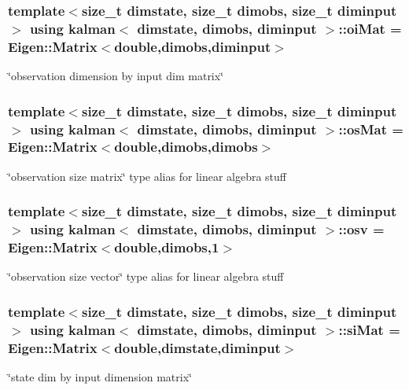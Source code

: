 \subsubsection[{\texorpdfstring{oi\+Mat}{oiMat}}]{\setlength{\rightskip}{0pt plus 5cm}template$<$size\+\_\+t dimstate, size\+\_\+t dimobs, size\+\_\+t diminput$>$ using {\bf kalman}$<$ dimstate, dimobs, diminput $>$\+::{\bf oi\+Mat} =  Eigen\+::\+Matrix$<$double,dimobs,diminput$>$\hspace{0.3cm}{\ttfamily [private]}}\hypertarget{classkalman_a2a9c411927e8ae35144b2c40dac2f3d1}{}\label{classkalman_a2a9c411927e8ae35144b2c40dac2f3d1}
\char`\"{}observation dimension by input dim matrix\char`\"{} 
\subsubsection[{\texorpdfstring{os\+Mat}{osMat}}]{\setlength{\rightskip}{0pt plus 5cm}template$<$size\+\_\+t dimstate, size\+\_\+t dimobs, size\+\_\+t diminput$>$ using {\bf kalman}$<$ dimstate, dimobs, diminput $>$\+::{\bf os\+Mat} =  Eigen\+::\+Matrix$<$double,dimobs,dimobs$>$\hspace{0.3cm}{\ttfamily [private]}}\hypertarget{classkalman_a092ff444bcb70f49972e645bc993fd79}{}\label{classkalman_a092ff444bcb70f49972e645bc993fd79}
\char`\"{}observation size matrix\char`\"{} type alias for linear algebra stuff 
\subsubsection[{\texorpdfstring{osv}{osv}}]{\setlength{\rightskip}{0pt plus 5cm}template$<$size\+\_\+t dimstate, size\+\_\+t dimobs, size\+\_\+t diminput$>$ using {\bf kalman}$<$ dimstate, dimobs, diminput $>$\+::{\bf osv} =  Eigen\+::\+Matrix$<$double,dimobs,1$>$\hspace{0.3cm}{\ttfamily [private]}}\hypertarget{classkalman_a59427bc89132911a2afb9f42ebff0b28}{}\label{classkalman_a59427bc89132911a2afb9f42ebff0b28}
\char`\"{}observation size vector\char`\"{} type alias for linear algebra stuff 
\subsubsection[{\texorpdfstring{si\+Mat}{siMat}}]{\setlength{\rightskip}{0pt plus 5cm}template$<$size\+\_\+t dimstate, size\+\_\+t dimobs, size\+\_\+t diminput$>$ using {\bf kalman}$<$ dimstate, dimobs, diminput $>$\+::{\bf si\+Mat} =  Eigen\+::\+Matrix$<$double,dimstate,diminput$>$\hspace{0.3cm}{\ttfamily [private]}}\hypertarget{classkalman_a8311e2213ec968dc595add5f6933d091}{}\label{classkalman_a8311e2213ec968dc595add5f6933d091}
\char`\"{}state dim by input dimension matrix\char`\"{} 

